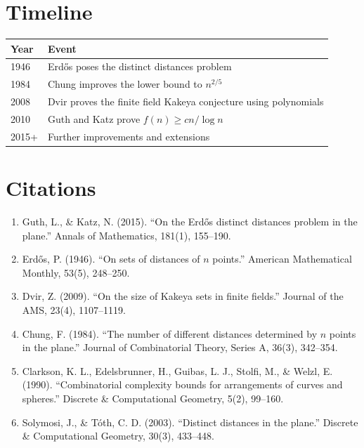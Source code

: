 \section{Timeline}

\begin{tabularx}{\linewidth}{lX}
\toprule
\textbf{Year} & \textbf{Event} \\ \midrule
1946 & Erd\H{o}s poses the distinct distances problem \cite{erdos1946} \\ 
1984 & Chung improves the lower bound to $n^{2/5}$ \cite{chung1984} \\ 
2008 & Dvir proves the finite field Kakeya conjecture using polynomials \cite{dvir2009} \\ 
2010 & Guth and Katz prove $f(n) \geq cn/\log n$ \cite{guth2015} \\ 
2015+ & Further improvements and extensions \\ \bottomrule
\end{tabularx}

\section{Citations}

\begin{enumerate}
\item Guth, L., \& Katz, N. (2015). ``On the Erd\H{o}s distinct distances problem in the plane.'' Annals of Mathematics, 181(1), 155--190.
\item Erd\H{o}s, P. (1946). ``On sets of distances of $n$ points.'' American Mathematical Monthly, 53(5), 248--250.
\item Dvir, Z. (2009). ``On the size of Kakeya sets in finite fields.'' Journal of the AMS, 23(4), 1107--1119.
\item Chung, F. (1984). ``The number of different distances determined by $n$ points in the plane.'' Journal of Combinatorial Theory, Series A, 36(3), 342--354.
\item Clarkson, K. L., Edelsbrunner, H., Guibas, L. J., Stolfi, M., \& Welzl, E. (1990). ``Combinatorial complexity bounds for arrangements of curves and spheres.'' Discrete \& Computational Geometry, 5(2), 99--160.
\item Solymosi, J., \& T\'oth, C. D. (2003). ``Distinct distances in the plane.'' Discrete \& Computational Geometry, 30(3), 433--448.
\end{enumerate}
